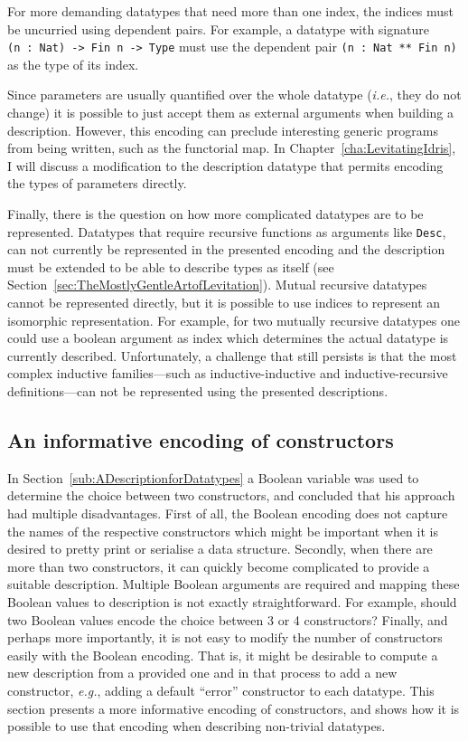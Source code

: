 \documentclass{ituthesis}
\newcommand{\tttype}[1]{\textcolor{type-color}{\texttt{#1}}}
\newcommand{\ttvar}[1]{\textcolor{local-var-color}{\texttt{#1}}}
\theoremstyle{break}
\begin{document}
For more demanding datatypes that need more than one index, the indices must be uncurried using dependent pairs.
For example, a datatype with signature \texttt{(}\ttvar{n}~\texttt{:}~\tttype{Nat}\texttt{)~->~}\tttype{Fin}~\ttvar{n}~\texttt{->}~\tttype{Type} must use the dependent pair \tttype{(}\ttvar{n}~\texttt{:}~\tttype{Nat}~\tttype{**}~\tttype{Fin}~\ttvar{n}\tttype{)} as the type of its index.

Since parameters are usually quantified over the whole datatype (\textit{i.e.}, they do not change) it is possible to just accept them as external arguments when building
a description.
However, this encoding can preclude interesting generic programs from being written, such as the functorial map. In Chapter~\ref{cha:LevitatingIdris}, I will discuss a modification to the description datatype that permits encoding the types of
parameters directly.

Finally, there is the question on how more complicated datatypes are to be represented.
Datatypes that require recursive functions as arguments like \tttype{Desc}, can not currently be represented in the presented encoding and the description must be extended to be able to describe types as itself (see Section~\ref{sec:TheMostlyGentleArtofLevitation}).
Mutual recursive datatypes cannot be represented directly, but it is possible to use indices to represent an isomorphic representation.
For example, for two mutually recursive datatypes one could use a boolean argument as index which determines the actual datatype is currently described.
Unfortunately, a challenge that still persists is that the most complex inductive families---such as inductive-inductive and inductive-recursive definitions---can not be represented using the presented descriptions.

\subsection{An informative encoding of constructors}
\label{sub:AnInformativeEncodingofConstructors}
In Section~\ref{sub:ADescriptionforDatatypes} a Boolean variable was used to determine the choice between two constructors, and concluded that his approach had multiple disadvantages.
First of all, the Boolean encoding does not capture the names of the respective constructors which might be important when it is desired to pretty print or serialise a data structure.
Secondly, when there are more than two constructors, it can quickly become complicated to provide a suitable description.
Multiple Boolean arguments are required and mapping these Boolean values to description is not exactly straightforward.
For example, should two Boolean values encode the choice between 3 or 4 constructors?
Finally, and perhaps more importantly, it is not easy to modify the number of constructors easily with the Boolean encoding. That is, it might be desirable to compute a new description from a provided one and in that process to add a new constructor,
\textit{e.g.}, adding a default ``error'' constructor to each datatype.
This section presents a more informative encoding of constructors, and shows how it is possible to use that encoding when describing non-trivial datatypes.
\end{document}
